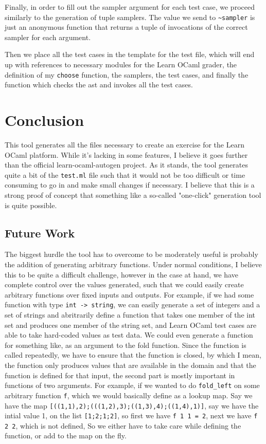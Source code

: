 \documentclass[11pt]{article} %
\begin{document}
Finally, in order to fill out the sampler argument for each test case, we proceed similarly to the generation of tuple samplers. The value we send to \verb+~sampler+ is just an anonymous function that returns a tuple of invocations of the correct sampler for each argument.

Then we place all the test cases in the template for the test file, which will end up with references to necessary modules for the Learn OCaml grader, the definition of my \verb+choose+ function, the samplers, the test cases, and finally the function which checks the ast and invokes all the test cases.

\section{Conclusion}
This tool generates all the files necessary to create an exercise for the Learn OCaml platform. While it's lacking in some features, I believe it goes further than the official learn-ocaml-autogen project. As it stands, the tool generates quite a bit of the \verb+test.ml+ file such that it would not be too difficult or time consuming to go in and make small changes if necessary. I believe that this is a strong proof of concept that something like a so-called "one-click" generation tool is quite possible.

\subsection{Future Work}
The biggest hurdle the tool has to overcome to be moderately useful is probably the addition of generating arbitrary functions. Under normal conditions, I believe this to be quite a difficult challenge, however in the case at hand, we have complete control over the values generated, such that we could easily create arbitrary functions over fixed inputs and outputs. For example, if we had some function with type \verb+int -> string+, we can easily generate a set of integers and a set of strings and abritrarily define a function that takes one member of the int set and produces one member of the string set, and Learn OCaml test cases are able to take hard-coded values as test data. We could even generate a function for something like, as an argument to the fold function. Since the function is called repeatedly, we have to ensure that the function is closed, by which I mean, the function only produces values that are available in the domain and that the function is defined for that input, the second part is mostly important in functions of two arguments. For example, if we wanted to do \verb+fold_left+ on some arbitrary function \verb+f+, which we would basically define as a lookup map. Say we have the map \verb+[((1,1),2);(((1,2),3);((1,3),4);((1,4),1)]+, say we have the intial value 1, on the list \verb+[1;2;1;2]+, so first we have \verb+f 1 1 = 2+, next we have \verb+f 2 2+, which is not defined, So we either have to take care while defining the function, or add to the map on the fly. 
\end{document}

